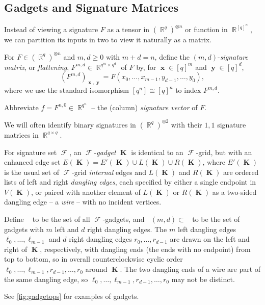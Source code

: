 \documentclass{theoretics}
\DeclareMathOperator{\rr}{\mathbb{R}}
\DeclareMathOperator{\vk}{\mathbf{K}}
\DeclareMathOperator{\vx}{\mathbf{x}}
\DeclareMathOperator{\vy}{\mathbf{y}}
\DeclareMathOperator{\fc}{\mathcal{F}}
\DeclareMathOperator{\gk}{\mathfrak{G}_{\mathcal{F}}}
\begin{document}
\subsection{Gadgets and Signature Matrices}
Instead of viewing a signature $F$ as a tensor in $(\rr^q)^{\otimes n}$ or function in $\rr^{[q]^n}$,
we can partition its inputs in two to view it naturally as a matrix.
\begin{definition}[$F^{m,d},f$]
    \label{def:sig_matrix}
    For $F \in (\rr^q)^{\otimes n}$ and $m,d \geq 0$ with $m+d=n$, define the 
    $(m,d)$-\emph{signature matrix}, or \emph{flattening}, $F^{m,d} \in \rr^{q^m\times q^d}$ of $F$
    by, for $\vx \in [q]^m$ and $\vy \in [q]^d$,
    \[
        (F^{m,d})_{\vx,\vy} = F(x_0,\ldots,x_{m-1},y_{d-1},\ldots,y_0),
    \]
    where we use the standard isomorphism $[q^n] \cong [q]^n$ to index $F^{m,d}$.

    Abbreviate $f = F^{n,0} \in \rr^{q^n}$ -- the (column) \emph{signature vector} of $F$.
\end{definition}
We will often identify binary signatures in $(\rr^q)^{\otimes 2}$
with their $1,1$ signature matrices in $\rr^{q \times q}$.
\begin{definition}[Gadget, $\gk,\gk(m,d)$]
    For signature set $\fc$, an $\fc$-\emph{gadget} $\vk$ is identical to an $\fc$-grid,
    but with an enhanced edge set $E(\vk) = E'(\vk) \cup L(\vk) \cup R(\vk)$, 
    where $E'(\vk)$ is the
    usual set of $\fc$-grid \emph{internal} edges and $L(\vk)$ and $R(\vk)$ are ordered
    lists of left and right \emph{dangling edges}, each specified by either a single endpoint 
    in $V(\vk)$, or paired with another element of $L(\vk)$ or $R(\vk)$ as
    a two-sided dangling edge -- a \emph{wire} -- with no incident vertices. 

    Define $\gk$ to be the set of all $\fc$-gadgets, and $\gk(m,d) \subset \gk$ to be the set 
    of gadgets with $m$ left and $d$ right dangling edges. The $m$ left dangling edges
    $\ell_0,\ldots,\ell_{m-1}$ and $d$ right dangling edges $r_{0}, \ldots, r_{d-1}$ 
    are drawn on the left and right of $\vk$, respectively, with dangling ends (the ends
    with no endpoint) from top to bottom, so in overall counterclockwise cyclic order
    $\ell_0, \ldots, \ell_{m-1}, r_{d-1}, \ldots, r_0$ around $\vk$.
    The two dangling ends of a wire are part of the same dangling edge, so
    $\ell_0, \ldots, \ell_{m-1}, r_{d-1}, \ldots, r_0$ may not be distinct.
\end{definition}
See \autoref{fig:gadgetops} for examples of gadgets.
\end{document}
